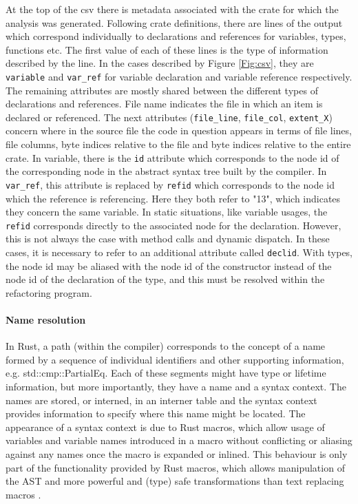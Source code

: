 At the top of the csv there is metadata associated with the crate for which the analysis was generated. Following crate definitions, there are lines of the output which correspond individually to declarations and references for variables, types, functions etc. The first value of each of these lines is the type of information described by the line. In the cases described by Figure \ref{Fig:csv}, they are {\verb|variable|} and {\verb|var_ref|} for variable declaration and variable reference respectively. The remaining attributes are mostly shared between the different types of declarations and references. File name indicates the file in which an item is declared or referenced. The next attributes ({\verb|file_line|}, {\verb|file_col|}, {\verb|extent_X|}) concern where in the source file the code in question appears in terms of file lines, file columns, byte indices relative to the file and byte indices relative to the entire crate. In variable, there is the {\verb|id|} attribute which corresponds to the node id of the corresponding node in the abstract syntax tree built by the compiler. In {\verb|var_ref|}, this attribute is replaced by {\verb|refid|} which corresponds to the node id which the reference is referencing. Here they both refer to "13", which indicates they concern the same variable. In static situations, like variable usages, the {\verb|refid|} corresponds directly to the associated node for the declaration. However, this is not always the case with method calls and dynamic dispatch. In these cases, it is necessary to refer to an additional attribute called {\verb|declid|}. With types, the node id may be aliased with the node id of the constructor instead of the node id of the declaration of the type, and this must be resolved within the refactoring program.

\paragraph{Name resolution}
In Rust, a path (within the compiler) corresponds to the concept of a name formed by a sequence of individual identifiers and other supporting information, e.g. std::cmp::PartialEq. Each of these segments might have type or lifetime information, but more importantly, they have a name and a syntax context. The names are stored, or interned, in an interner table and the syntax context provides information to specify where this name might be located. The appearance of a syntax context is due to Rust macros, which allow usage of variables and variable names introduced in a macro without conflicting or aliasing against any names once the macro is expanded or inlined. This behaviour is only part of the functionality provided by Rust macros, which allows manipulation of the AST and more powerful and (type) safe transformations than text replacing macros \cite{keep15}.

